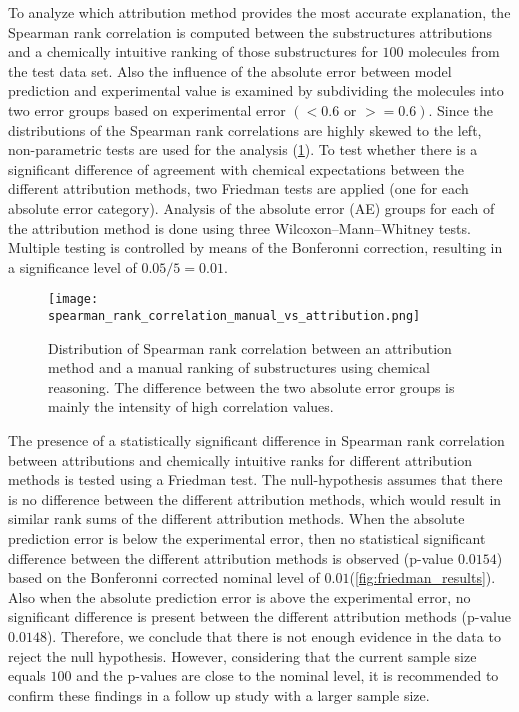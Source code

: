 

To analyze which attribution method provides the most accurate
explanation, the Spearman rank correlation is computed between the
substructures attributions and a chemically intuitive ranking of those
substructures for $100$ molecules from the test data set. Also the influence of the absolute error between model
prediction and experimental value is examined by subdividing the
molecules into two error groups based on experimental error $(<0.6 \text{ or } >=0.6)$. Since the distributions of
the Spearman rank correlations are highly skewed to the left,
non-parametric tests are used for the analysis (\cref{fig:spearman_corr_manual}). To test whether there is
a significant difference of agreement with chemical expectations between 
the different attribution methods, two Friedman tests are applied (one for each absolute error
category). Analysis of the absolute error (AE) groups for each of 
the attribution method is done using three Wilcoxon--Mann--Whitney tests.
Multiple testing is controlled by means of the Bonferonni correction, 
resulting in a significance level of $0.05/5 = 0.01$.


\begin{figure}[h]
    \centering
    \texttt{[image: spearman\_rank\_correlation\_manual\_vs\_attribution.png]}
    \caption{Distribution of Spearman rank correlation between an attribution method 
        and a manual ranking of substructures using chemical reasoning. The difference 
        between the two absolute error groups is mainly the intensity of high 
        correlation values.
    }
    \label{fig:spearman_corr_manual}
\end{figure}


The presence of a statistically significant difference in Spearman rank correlation
between attributions and chemically intuitive ranks for different
attribution methods is tested using a Friedman test. The null-hypothesis
assumes that there is no difference between the different attribution
methods, which would result in similar rank sums of the different
attribution methods. When the absolute prediction error is below the 
experimental error, then no statistical significant difference between 
the different attribution methods is observed (p-value $0.0154$) based 
on the Bonferonni corrected nominal level of $0.01$(\cref{fig:friedman_results}). 
Also when the absolute prediction error is above the experimental error, no significant difference 
is present between the different attribution methods (p-value $0.0148$). 
Therefore, we conclude that there is not enough
evidence in the data to reject the null hypothesis. However, considering 
that the current sample size equals $100$ and the p-values are close to the 
nominal level, it is recommended to confirm these findings in a follow up 
study with a larger sample size.


